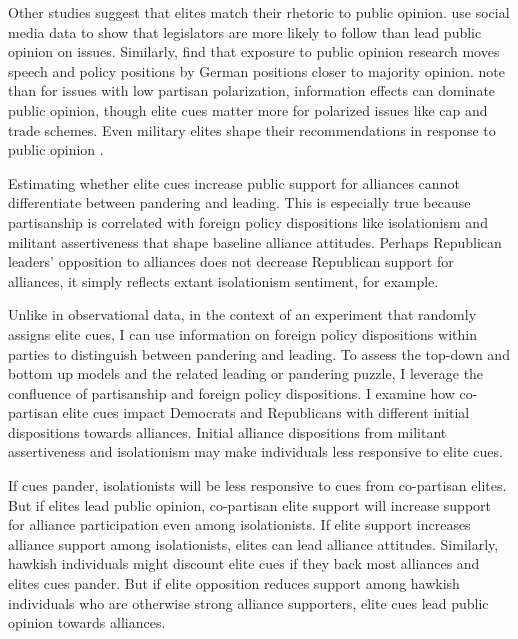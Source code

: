 \documentclass[12pt]{article}
\begin{document}
Other studies suggest that elites match their rhetoric to public opinion. 
\citet{Barberaetal2019} use social media data to show that legislators are more likely to follow than lead public opinion on issues. 
Similarly, \citet{HagerHilbig2020} find that exposure to public opinion research moves speech and policy positions by German positions closer to majority opinion. 
\citet{GuisingerSaunders2017} note than for issues with low partisan polarization, information effects can dominate public opinion, though elite cues matter more for polarized issues like cap and trade schemes. 
Even military elites shape their recommendations in response to public opinion \citep{LinGreenberg2021}. 



Estimating whether elite cues increase public support for alliances cannot differentiate between pandering and leading. 
This is especially true because partisanship is correlated with foreign policy dispositions like isolationism and militant assertiveness that shape baseline alliance attitudes. 
Perhaps Republican leaders' opposition to alliances does not decrease Republican support for alliances, it simply reflects extant isolationism sentiment, for example. 



Unlike in observational data, in the context of an experiment that randomly assigns elite cues, I can use information on foreign policy dispositions within parties to distinguish between pandering and leading. 
To assess the top-down and bottom up models and the related leading or pandering puzzle, I leverage the confluence of partisanship and foreign policy dispositions.
I examine how co-partisan elite cues impact Democrats and Republicans with different initial dispositions towards alliances.
Initial alliance dispositions from militant assertiveness and isolationism may make individuals less responsive to elite cues. 


If cues pander, isolationists will be less responsive to cues from co-partisan elites.
But if elites lead public opinion, co-partisan elite support will increase support for alliance participation even among isolationists. 
If elite support increases alliance support among isolationists, elites can lead alliance attitudes. 
Similarly, hawkish individuals might discount elite cues if they back most alliances and elites cues pander. 
But if elite opposition reduces support among hawkish individuals who are otherwise strong alliance supporters, elite cues lead public opinion towards alliances. 
\end{document}
